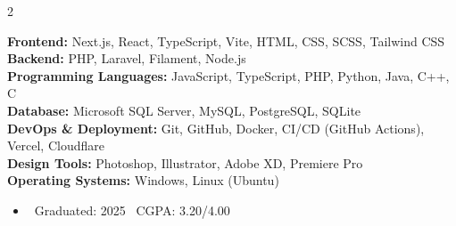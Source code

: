 \documentclass[10pt,a4paper,ragged2e,withhyper]{files/altacv}
\begin{document}
\begin{paracol}{2}
    \switchcolumn

    \newcommand{\skilltag}[2]{\textbf{#1:} #2}

    \skilltag{Frontend}{Next.js, React, TypeScript, Vite, HTML, CSS, SCSS, Tailwind CSS}\\[0.5em]
    \skilltag{Backend}{PHP, Laravel, Filament, Node.js}\\[0.5em]
    \skilltag{Programming Languages}{JavaScript, TypeScript, PHP, Python, Java, C++, C}\\[0.5em]
    \skilltag{Database}{Microsoft SQL Server, MySQL, PostgreSQL, SQLite}\\[0.5em]
    \skilltag{DevOps \& Deployment}{Git, GitHub, Docker, CI/CD (GitHub Actions), Vercel, Cloudflare}\\[0.5em]
    \skilltag{Design Tools}{Photoshop, Illustrator, Adobe XD, Premiere Pro}\\[0.5em]
    \skilltag{Operating Systems}{Windows, Linux (Ubuntu)}\\[0.5em]

    \vspace{4mm}

    \begin{itemize}[leftmargin=0cm, label={\color{primary}}, itemsep=0pt]
        \item  \faGraduationCap\ Graduated: 2025 \hspace{3mm} \faMedal\ CGPA: 3.20/4.00
    \end{itemize}

    \\[0.5em]
    \vspace{4mm}


\end{paracol}
\end{document}
